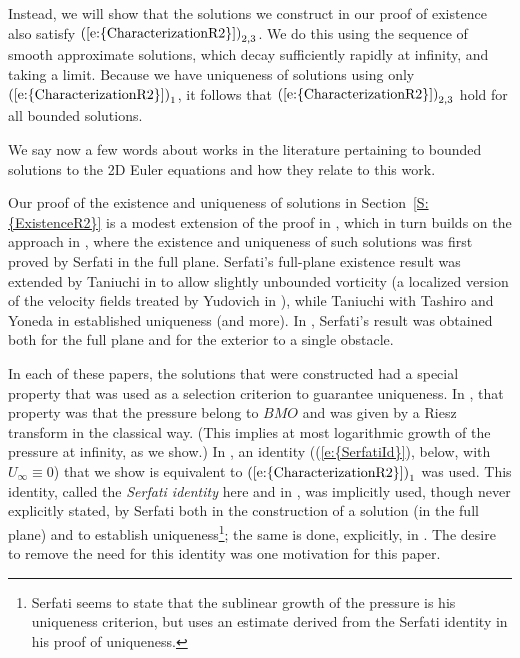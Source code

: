 \documentclass[reqno,openright,11pt,twoside]{amsart}
\theoremstyle{definition}
\numberwithin{equation}{section}
\begin{document}
Instead, we will show that the solutions we construct in our proof of existence also satisfy ${(\ref{e:{CharacterizationR2}})}_{2, 3}$. We do this using the sequence of smooth approximate solutions, which decay sufficiently rapidly at infinity, and taking a limit. Because we have uniqueness of solutions using only ${(\ref{e:{CharacterizationR2}})}_1$, it follows that ${(\ref{e:{CharacterizationR2}})}_{2, 3}$ hold for all bounded solutions.

\bigskip

We say now a few words about works in the literature pertaining to bounded solutions to the 2D Euler equations and how they relate to this work.

Our proof of the existence and uniqueness of solutions in {Section~\ref{S:{ExistenceR2}}} is a modest extension of the proof in \cite{AKLL2014}, which in turn builds on the approach in \cite{Serfati1995A}, where the existence and uniqueness of such solutions was first proved by Serfati in the full plane. Serfati's full-plane existence result was extended by Taniuchi in \cite{Taniuchi2004} to allow slightly unbounded vorticity (a localized version of the velocity fields treated by Yudovich in \cite{Y1995}), while Taniuchi with Tashiro and Yoneda in \cite{TaniuchiEtAl2010} established uniqueness (and more). In \cite{AKLL2014}, Serfati's result was obtained both for the full plane and for the exterior to a single obstacle.

In each of these papers, the solutions that were constructed had a special property that was used as a selection criterion to guarantee uniqueness. In \cite{Taniuchi2004, TaniuchiEtAl2010}, that property was that the pressure belong to $BMO$ and was given by a Riesz transform in the classical way. (This implies at most logarithmic growth of the pressure at infinity, as we show.) In \cite{AKLL2014}, an identity ({(\ref{e:{SerfatiId}})}, below, with $U_{\ensuremath{\infty}} \equiv 0$) that we show is equivalent to ${(\ref{e:{CharacterizationR2}})}_1$ was used. This identity, called the \textit{Serfati identity} here and in \cite{AKLL2014}, was implicitly used, though never explicitly stated, by Serfati both in the construction of a solution (in the full plane) and to establish uniqueness\footnote{Serfati seems to state that the sublinear growth of the pressure is his uniqueness criterion, but uses an estimate derived from the Serfati identity in his proof of uniqueness.}; the same is done, explicitly, in \cite{AKLL2014}. The desire to remove the need for this identity was one motivation for this paper.
\end{document}

